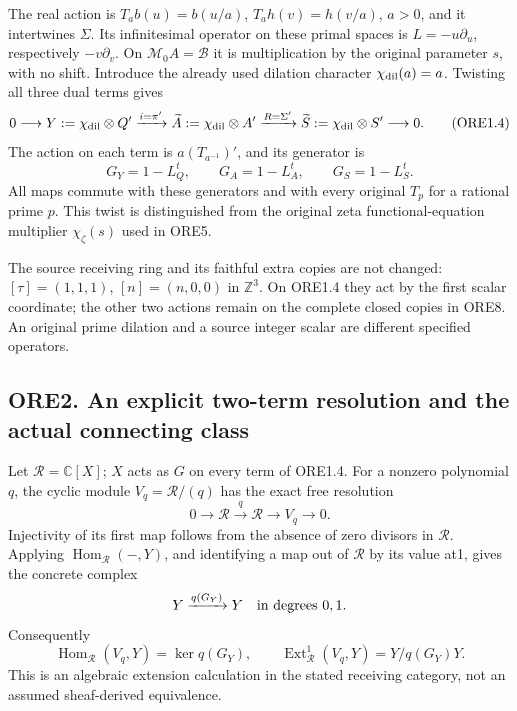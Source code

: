 The real action is \(T_ab(u)=b(u/a)\), \(T_ah(v)=h(v/a)\), \(a>0\), and
it intertwines \(\Sigma\). Its infinitesimal operator on these primal
spaces is \(L=-u\partial_u\), respectively \(-v\partial_v\). On
\(\mathcal M_0 A=\mathcal B\) it is multiplication by the original
parameter \(s\), with no shift. Introduce the already used dilation
character \(\chi_{\rm dil}(a)=a\). Twisting all three dual terms gives
\[
0\longrightarrow Y:=\chi_{\rm dil}\otimes Q'
\xrightarrow{i=\pi'}\widetilde A:=\chi_{\rm dil}\otimes A'
\xrightarrow{R=\Sigma'}\widetilde S:=\chi_{\rm dil}\otimes S'
\longrightarrow0.
\tag{ORE1.4}
\] The action on each term is \(a(T_{a^{-1}})'\), and its generator is
\[
G_Y=1-L_Q^t,\qquad G_A=1-L_A^t,\qquad G_S=1-L_S^t.
\tag{ORE1.5}
\] All maps commute with these generators and with every original
\(T_p\) for a rational prime \(p\). This twist is distinguished from the
original zeta functional-equation multiplier \(\chi_\zeta(s)\) used in
ORE5.

The source receiving ring and its faithful extra copies are not changed:
\([\tau]=(1,1,1)\), \([n]=(n,0,0)\) in \(\mathbb Z^3\). On ORE1.4 they
act by the first scalar coordinate; the other two actions remain on the
complete closed copies in ORE8. An original prime dilation and a source
integer scalar are different specified operators.

\subsection{ORE2. An explicit two-term resolution and the actual
connecting
class}\label{ore2.-an-explicit-two-term-resolution-and-the-actual-connecting-class}

Let \(\mathcal R=\mathbb C[X]\); \(X\) acts as \(G\) on every term of
ORE1.4. For a nonzero polynomial \(q\), the cyclic module
\(V_q=\mathcal R/(q)\) has the exact free resolution \[
0\longrightarrow\mathcal R\xrightarrow{q}\mathcal R
\longrightarrow V_q\longrightarrow0.
\tag{ORE2.1}
\] Injectivity of its first map follows from the absence of zero
divisors in \(\mathcal R\). Applying
\(\operatorname{Hom}_{\mathcal R}(-,Y)\), and identifying a map out of
\(\mathcal R\) by its value at1, gives the concrete complex \[
Y\xrightarrow{q(G_Y)}Y
\quad\hbox{in degrees }0,1.
\] Consequently \[
\operatorname{Hom}_{\mathcal R}(V_q,Y)=\ker q(G_Y),
\qquad
\operatorname{Ext}^1_{\mathcal R}(V_q,Y)=Y/q(G_Y)Y.
\tag{ORE2.2}
\] This is an algebraic extension calculation in the stated receiving
category, not an assumed sheaf-derived equivalence.

